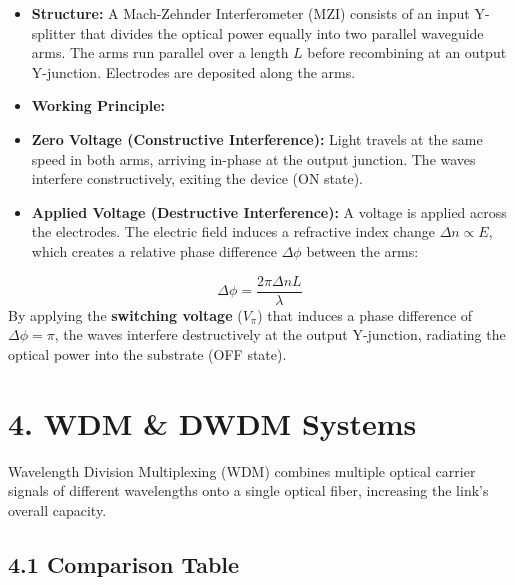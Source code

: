\begin{itemize}
  \item   \textbf{Structure:} A Mach-Zehnder Interferometer (MZI) consists of an input Y-splitter that divides the optical power equally into two parallel waveguide arms. The arms run parallel over a length $L$ before recombining at an output Y-junction. Electrodes are deposited along the arms.
  \item   \textbf{Working Principle:}
  \item   \textbf{Zero Voltage (Constructive Interference):} Light travels at the same speed in both arms, arriving in-phase at the output junction. The waves interfere constructively, exiting the device (ON state).
  \item   \textbf{Applied Voltage (Destructive Interference):} A voltage is applied across the electrodes. The electric field induces a refractive index change $\Delta n \propto E$, which creates a relative phase difference $\Delta\phi$ between the arms:
\end{itemize}
        \[ \Delta\phi = \frac{2\pi \Delta n L}{\lambda} \]
        By applying the \textbf{switching voltage} ($V_\pi$) that induces a phase difference of $\Delta\phi = \pi$, the waves interfere destructively at the output Y-junction, radiating the optical power into the substrate (OFF state).


\section{4. WDM \& DWDM Systems}

Wavelength Division Multiplexing (WDM) combines multiple optical carrier signals of different wavelengths onto a single optical fiber, increasing the link's overall capacity.

\subsection{4.1 Comparison Table}

